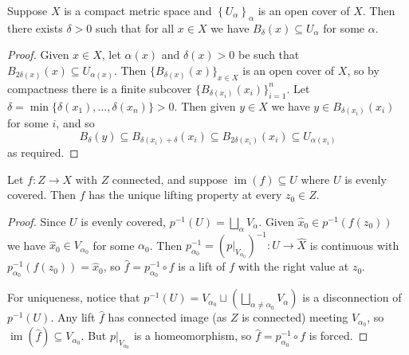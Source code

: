 \begin{lemma} \label{lem:lebesgue}
	Suppose $X$ is a compact metric space and $\left\{U_\alpha\right\}_\alpha$ is an open cover of $X$. Then there exists $\delta>0$ such that for all $x \in X$ we have $B_\delta(x) \subseteq U_\alpha$ for some $\alpha$.
\end{lemma}
\begin{proof}
	Given $x \in X$, let $\alpha(x)$ and $\delta(x)>0$ be such that $B_{2 \delta(x)}(x) \subseteq U_{\alpha(x)}$. Then $\{B_{\delta(x)}(x)\}_{x \in X}$ is an open cover of $X$, so by compactness there is a finite subcover $\{B_{\delta(x_i)}(x_i)\}_{i=1}^n$. Let $\delta=\min \{\delta(x_1), \ldots, \delta(x_n)\}>0$. Then given $y \in X$ we have $y \in B_{\delta(x_i)}(x_i)$ for some $i$, and so
	$$
	B_\delta(y) \subseteq B_{\delta(x_i) + \delta}(x_i) \subseteq B_{2 \delta(x_i)}(x_i) \subseteq U_{\alpha(x_i)}
	$$
	as required.
\end{proof}

\begin{lemma} \label{lem:lift-small}
	Let $f: Z \to X$ with $Z$ connected, and suppose $\operatorname{im}(f) \subseteq U$ where $U$ is evenly covered. Then $f$ has the unique lifting property at every $z_0 \in Z$.
\end{lemma}
\begin{proof}
	Since $U$ is evenly covered, $p^{-1}(U)=\bigsqcup_\alpha V_\alpha$. Given $\hat x_0 \in p^{-1}(f(z_0))$ we have $\hat{x}_0 \in V_{\alpha_0}$ for some $\alpha_0$. Then $p_{\alpha_0}^{-1} = (p|_{V_{\alpha_0}})^{-1}: U \rightarrow \hat{X}$ is continuous with $p_{\alpha_0}^{-1}(f(z_0))=\hat{x}_0$, so $\hat{f}=p_{\alpha_0}^{-1} \circ f$ is a lift of $f$ with the right value at $z_0$.

	For uniqueness, notice that $p^{-1}(U)=V_{\alpha_0} \sqcup(\bigsqcup_{\alpha \neq \alpha_0} V_\alpha)$ is a disconnection of $p^{-1}(U)$. Any lift $\hat f$ has connected image (as $Z$ is connected) meeting $V_{\alpha_0}$, so $\operatorname{im}(\hat{f}) \subseteq V_{\alpha_0}$. But $p|_{V_{\alpha_0}}$ is a homeomorphism, so $\hat f = p_{\alpha_0}^{-1} \circ f$ is forced.
\end{proof}

